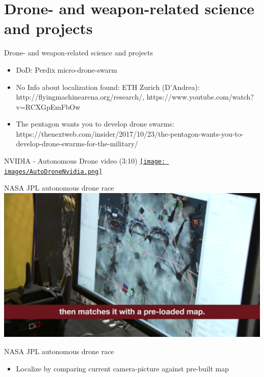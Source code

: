 \documentclass[aspectratio=169]{beamer}
\begin{document}
\section{Drone- and weapon-related science and projects}
\begin{frame}{Drone- and weapon-related science and projects}
	\begin{itemize}
		\item DoD: Perdix micro-drone-swarm
		\item No Info about localization found: ETH Zurich (D'Andrea): http://flyingmachinearena.org/research/, https://www.youtube.com/watch?v=RCXGpEmFbOw
        \item The pentagon wants you to develop drone swarms: https://thenextweb.com/insider/2017/10/23/the-pentagon-wants-you-to-develop-drone-swarms-for-the-military/
	\end{itemize}
\end{frame}

\begin{frame}{NVIDIA - Autonomous Drone video (3:10)}
        	\centering
            \href{run:./videos/AutoDroneNvidia.mp4?autostart}
            {\texttt{[image: images/AutoDroneNvidia.png]}}
\end{frame}

\begin{frame}{NASA JPL autonomous drone race}
        	\centering
            \href{run:./videos/NasaAutoDrone.mp4?autostart}
            {\includegraphics[width=\linewidth]{images/nasa.png}}
\end{frame}
\begin{frame}{NASA JPL autonomous drone race}
	\begin{itemize}
		\item Localize by comparing current camera-picture against pre-built map
	\end{itemize}
	\color{gray}{https://www.nasa.gov/feature/jpl/drone-race-human-versus-artificial-intelligence}
\end{frame}
\end{document}
